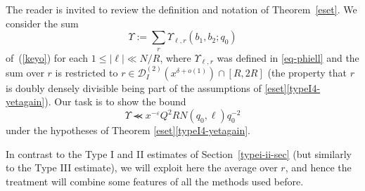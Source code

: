\documentclass[12pt,a4paper,reqno]{amsart}
\numberwithin{equation}{section}
\theoremstyle{plain}
\theoremstyle{definition}
\newcommand\R{\mathbb{R}}
\newcommand\eps{\varepsilon}
\newcommand{\DI}[3]{\mathcal{D}_{{#1}}^{({#2})}({#3})}
\newcommand{\DIone}[2]{\mathcal{D}_{{#1}}({#2})}
\def\stacksum#1#2{{\stackrel{{\scriptstyle #1}}
{{\scriptstyle #2}}}}
\renewcommand{\sim}{\asymp}
\renewcommand{\lessapprox}{\llcurly}
\newcommand{\onef}{\mathbf{1}}
\begin{document}
The reader is invited to review the definition and notation of
Theorem~\ref{eset}. We consider the sum
$$
\Upsilon:= \sum_{r}\Upsilon_{\ell,r}(b_1,b_2;q_0)
$$
of~(\ref{keyo}) for each $1\leq |\ell|\ll N/R$, where $\Upsilon_{\ell,r}$ was defined in \eqref{eq-phiell} and the sum over $r$
is restricted to $r\in \DI{I}{2}{x^{\delta+o(1)}} \cap [R,2R]$ (the
property that $r$ is doubly densely divisible being part of the
assumptions of \ref{eset}\eqref{typeI4-yetagain}).  Our task is to show the bound
$$ \Upsilon  \lessapprox x^{-\eps} Q^2R N  (q_0,\ell)q_0^{-2}$$
under the hypotheses of Theorem \ref{eset}\eqref{typeI4-yetagain}.
\par
In contrast to the Type I and II estimates of
Section~\ref{typei-ii-sec} (but similarly to the Type III estimate),
we will exploit here the average over $r$, and hence the treatment
will combine some features of all the methods used before.
\par
\end{document}
